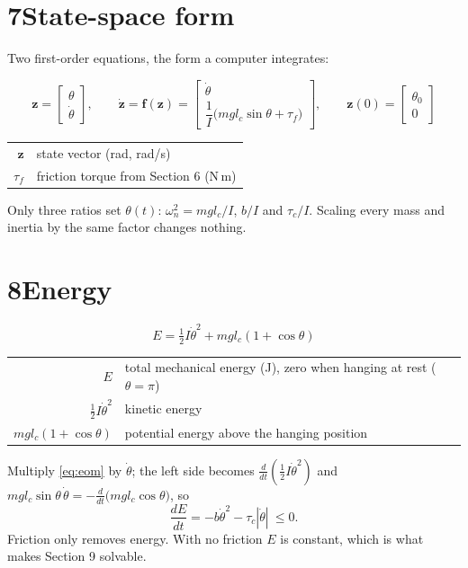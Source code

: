 \documentclass[11pt]{article}
\makeatletter
\newcommand{\where}[1]{\par\vspace{-2pt}{\small\color{muted}\textit{where}}\par\vspace{-2pt}
  {\small\renewcommand{\arraystretch}{1.08}\begin{tabular}{@{}>{$}r<{$}@{\;\;}l@{}}#1\end{tabular}}}
\makeatother
\begin{document}
\section*{7\quad State-space form}
Two first-order equations, the form a computer integrates:
\begin{result}
\begin{equation}
\bm z=\begin{bmatrix}\theta\\ \dot\theta\end{bmatrix},\qquad
\dot{\bm z}=\bm f(\bm z)=\begin{bmatrix}\dot\theta\\[2pt] \dfrac{1}{I}\big(m g l_c\sin\theta+\tau_f\big)\end{bmatrix},\qquad
\bm z(0)=\begin{bmatrix}\theta_0\\ 0\end{bmatrix} \label{eq:ss}
\end{equation}
\where{\bm z & state vector (rad, rad/s)\\ \tau_f & friction torque from Section 6 (N\,m)}
\end{result}
Only three ratios set $\theta(t)$: $\omega_n^2=m g l_c/I$, $b/I$ and $\tau_c/I$. Scaling every mass and inertia by the same factor changes nothing.

\section*{8\quad Energy}
\begin{result}
\begin{equation}
E=\tfrac12 I\dot\theta^2+m g l_c(1+\cos\theta) \label{eq:E}
\end{equation}
\where{E & total mechanical energy (J), zero when hanging at rest ($\theta=\pi$)\\ \tfrac12 I\dot\theta^2 & kinetic energy\\ m g l_c(1+\cos\theta) & potential energy above the hanging position}
\end{result}
Multiply \eqref{eq:eom} by $\dot\theta$; the left side becomes $\tfrac{d}{dt}(\tfrac12 I\dot\theta^2)$ and $m g l_c\sin\theta\,\dot\theta=-\tfrac{d}{dt}\big(m g l_c\cos\theta\big)$, so
\begin{equation}
\frac{dE}{dt}=-b\dot\theta^2-\tau_c|\dot\theta|\ \le 0 .
\end{equation}
Friction only removes energy. With no friction $E$ is constant, which is what makes Section 9 solvable.
\end{document}
